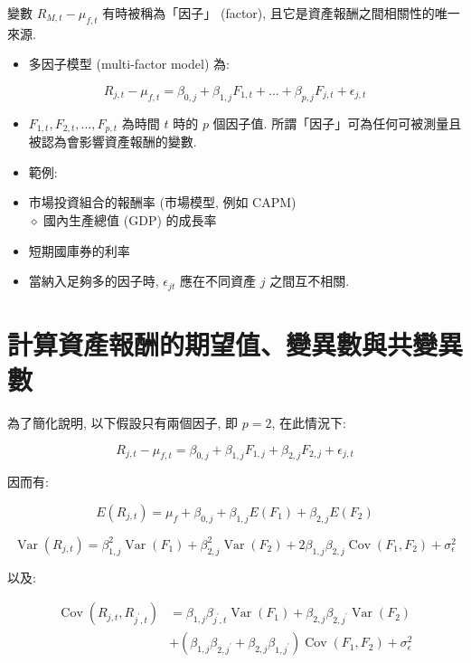 \documentclass[letterpaper]{article}
\begin{document}
		變數 $R_{M, t}-\mu_{f, t}$ 有時被稱為「因子」 (factor), 且它是資產報酬之間相關性的唯一來源. 
		
		\begin{itemize}
			\item 多因子模型 (multi-factor model) 為: 
		\end{itemize}
		
		
		$$
		R_{j, t}-\mu_{f, t}=\beta_{0, j}+\beta_{1, j} F_{1, t}+\ldots+\beta_{p, j} F_{j, t}+\epsilon_{j, t}
		$$
		
		\begin{itemize}
			\item $F_{1, t}, F_{2, t}, \ldots, F_{p, t}$ 為時間 $t$ 時的 $p$ 個因子值. 所謂「因子」可為任何可被測量且被認為會影響資產報酬的變數. 
		\end{itemize}
		
		\begin{itemize}
			\item 範例: 
			\item 市場投資組合的報酬率 (市場模型, 例如 CAPM) \\
			$\diamond$ 國內生產總值 (GDP) 的成長率
			\item 短期國庫券的利率
			\item 當納入足夠多的因子時, $\epsilon_{j t}$ 應在不同資產 $j$ 之間互不相關. 
		\end{itemize}
		
		\section*{計算資產報酬的期望值、變異數與共變異數}
		為了簡化說明, 以下假設只有兩個因子, 即 $p=2$, 在此情況下: 
		
		$$
		R_{j, t}-\mu_{f, t}=\beta_{0, j}+\beta_{1, j} F_{1, j}+\beta_{2, j} F_{2, j}+\epsilon_{j, t}
		$$
		
		因而有: 
		
		$$
		E\left (R_{j, t}\right) =\mu_{f}+\beta_{0, j}+\beta_{1, j} E\left (F_{1}\right) +\beta_{2, j} E\left (F_{2}\right) 
		$$
		
		$$
		\operatorname{Var}\left (R_{j, t}\right) =\beta_{1, j}^{2} \operatorname{Var}\left (F_{1}\right) +\beta_{2, j}^{2} \operatorname{Var}\left (F_{2}\right) +2 \beta_{1, j} \beta_{2, j} \operatorname{Cov}\left (F_{1}, F_{2}\right) +\sigma_{\epsilon}^{2}
		$$
		
		以及: 
		
		$$
		\begin{aligned}
			\operatorname{Cov}\left (R_{j, t}, R_{j^{\prime}, t}\right) & =\beta_{1, j} \beta_{j^{\prime}, t} \operatorname{Var}\left (F_{1}\right) +\beta_{2, j} \beta_{2, j^{\prime}} \operatorname{Var}\left (F_{2}\right) \\
			& +\left (\beta_{1, j} \beta_{2, j^{\prime}}+\beta_{2, j} \beta_{1, j^{\prime}}\right) \operatorname{Cov}\left (F_{1}, F_{2}\right) +\sigma_{\epsilon}^{2}
		\end{aligned}
		$$
		
		
	
\end{document}
